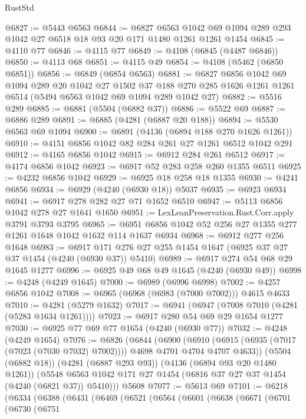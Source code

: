 \begin{lexlean}{RustStd}
\begin{coremodule}
{\begin{coremodule}
{{{{{{{{{{{{{{{{{{{{{{{{{{{{{{{{{{{@6827 := @5443 @6563
@6844 := @6827
    @6563
    @1042
    @69
    @1094
    @289
    @293
    @1042
    @27
    @6518
    @18
    @93
    @20
    @171
    @1480
    @1261
    @1261
    @1454
@6845 := @4110 @77
@6846 := @4115 @77
@6849 := @4108 (@6845 (@4487 @6846))
@6850 := @4113 @68
@6851 := @4115 @49
@6854 := @4108 (@5462 (@6850 @6851))
@6856 := @6849 (@6854 @6563)
@6881 := @6827
    @6856
    @1042
    @69
    @1094
    @289
    @20
    @1042
    @27
    @1502
    @37
    @188
    @270
    @285
    @1626
    @1261
    @1261
    @6514
    (@5494 @6563 @1042 @69 @1094 @289 @1042 @27)
@6882 := @5516 @289
@6885 := @6881 (@5504 (@6882 @37))
@6886 := @5522 @69
@6887 := @6886 @289
@6891 := @6885 (@4281 (@6887 @20 @188))
@6894 := @5530 @6563 @69 @1094
@6900 := @6891 (@4136 (@6894 @188 @270 @1626 @1261))
@6910 := @4151 @6856 @1042 @82 @284 @261 @27 @1261 @6512 @1042 @291
@6912 := @4165 @6856 @1042
@6915 := @6912 @284 @261 @6512
@6917 := @4174 @6856 @1042
@6923 := @6917 @52 @283 @258 @260 @1355 @6511
@6925 := @4232 @6856 @1042
@6929 := @6925 @18 @258 @18 @1355
@6930 := @4241 @6856
@6934 := @6929 (@4240 (@6930 @18)) @5037
@6935 := @6923 @6934
@6941 := @6917 @278 @282 @27 @71 @1652 @6510
@6947 := @5113 @6856 @1042 @278 @27 @1641 @1650
@6951 := LexLeanPreservation.Rust.Corr.apply @3791 @3793 @3795
@6965 := @6951 @6856 @1042 @52 @256 @27 @1355 @277 @1261 @1648 @1042 @1632 @114 @1637 @6934
@6968 := @6912 @277 @256 @1648
@6983 := @6917 @171 @276 @27 @255 @1454 @1647 (@6925 @37 @27 @37 @1454 (@4240 (@6930 @37)) @5410)
@6989 := @6917 @274 @54 @68 @29 @1645 @1277
@6996 := @6925 @49 @68 @49 @1645 (@4240 (@6930 @49))
@6998 := @4248 (@4249 @1645)
@7000 := @6989 (@6996 @6998)
@7002 := @4257 @6856 @1042
@7008 := @6965 (@6968 (@6983 (@7000 @7002))) @4615 @4633
@7010 := @4281 (@5279 @1632)
@7017 := @6941 (@6947 (@7008 @7010 (@4281 (@5283 @1634 @1261))))
@7023 := @6917 @280 @54 @69 @29 @1654 @1277
@7030 := @6925 @77 @69 @77 @1654 (@4240 (@6930 @77))
@7032 := @4248 (@4249 @1654)
@7076 := @6826
    (@6844
      (@6900
        (@6910 (@6915 (@6935 (@7017 (@7023 (@7030 @7032) @7002)))) @4698 @4701 @4704 @4707 @4633))
      (@5504 (@6882 @18))
      (@4281 (@6887 @293 @93))
      (@4136 (@6894 @93 @20 @1480 @1261))
      (@5548 @6563 @1042 @171 @27 @1454 (@6816 @37 @27 @37 @1454 (@4240 (@6821 @37)) @5410)))
    @5608
@7077 := @5613 @69
@7101 := @6218
    (@6334
      (@6388
        (@6431
          (@6469
            (@6521
              (@6564
                (@6601
                  (@6638
                    (@6671
                      (@6701
                        (@6730
                          (@6751
}}}}}}}}}}}}}}}}}}}}}}}}}}}}}}}}}}}
\end{coremodule}}
\end{coremodule}
\end{lexlean}
